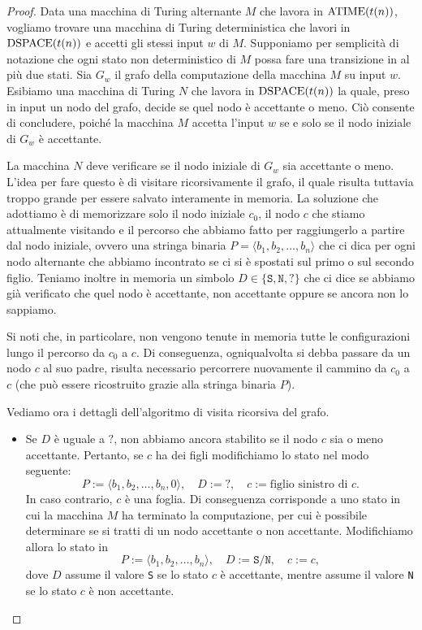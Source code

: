 \begin{proof}
 Data una macchina di Turing alternante $M$ che lavora in $\operatorname{ATIME}(t(n))$, vogliamo trovare
 una macchina di Turing deterministica che lavori in $\operatorname{DSPACE}(t(n))$ e accetti gli
 stessi input $w$ di $M$. Supponiamo per semplicità di notazione che ogni stato
 non deterministico di $M$ possa fare una transizione in al più due stati.
 Sia $G_w$ il grafo della computazione della macchina $M$ su input $w$.
 Esibiamo una macchina di Turing $N$ che lavora in $\operatorname{DSPACE}(t(n))$ la quale, preso in input un nodo
 del grafo, decide se quel nodo è accettante o meno. Ciò consente di concludere, poiché
 la macchina $M$ accetta l'input $w$ se e solo se il nodo iniziale
 di $G_w$ è accettante.
 
 La macchina $N$ deve verificare se il nodo iniziale di $G_w$ sia accettante o
 meno. L'idea per fare questo è di visitare ricorsivamente il grafo, il quale risulta tuttavia
  troppo grande per essere salvato interamente in memoria. La soluzione che adottiamo
 è di memorizzare solo il nodo iniziale $c_0$, il nodo $c$ che stiamo attualmente
 visitando e il percorso che abbiamo fatto per raggiungerlo a partire dal nodo
 iniziale, ovvero una stringa binaria $P = \langle b_1, b_2, \ldots, b_n \rangle$
 che ci dica per ogni nodo alternante
 che abbiamo incontrato se ci si è spostati sul primo o sul secondo figlio.
 Teniamo inoltre in memoria un simbolo $D \in \{\texttt{S}, \texttt{N}, \texttt{?}\}$ che ci dice se
 abbiamo già verificato che quel nodo è accettante, non accettante oppure
 se ancora non lo sappiamo.
 
 Si noti che, in particolare, non vengono tenute in memoria tutte le configurazioni lungo il percorso da $c_0$ a $c$.
 Di conseguenza, ogniqualvolta si debba passare da un nodo $c$ al suo padre,
 risulta necessario percorrere nuovamente il cammino da $c_0$ a $c$ (che può essere
 ricostruito grazie alla stringa binaria $P$).
 
 Vediamo ora i dettagli dell'algoritmo di visita ricorsiva del grafo.
 \begin{itemize}
  \item  Se $D$ è uguale a $\texttt{?}$, non abbiamo ancora stabilito se il nodo $c$ sia o meno
  accettante. Pertanto, se $c$ ha dei figli modifichiamo lo stato nel modo seguente:
  \[ P := \langle b_1, b_2, \ldots, b_n, 0 \rangle, \quad D := \texttt{?}, \quad c := \text{figlio sinistro di $c$}. \]
  In caso contrario, $c$ è una foglia. Di conseguenza corrisponde a uno stato in cui la macchina $M$
  ha terminato la computazione, per cui è possibile determinare se si tratti di un
  nodo accettante o non accettante. Modifichiamo allora lo stato in
  \[ P := \langle b_1, b_2, \ldots, b_n \rangle, \quad D := \texttt{S}/\texttt{N}, \quad c := c, \]
  dove $D$ assume il valore \texttt{S} se lo stato $c$ è accettante, mentre assume il valore \texttt{N} se lo stato $c$
  è non accettante.
  

\end{itemize}
\end{proof}
